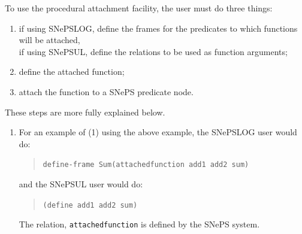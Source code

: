 \documentclass{book}
\begin{document}
To use the procedural attachment facility, the user must do three things:
\begin{enumerate}
 \item if using SNePSLOG, define the frames for the predicates to which
    functions will be attached,\\
    if using SNePSUL, define the relations to be used as function arguments;
\item  define the attached function;
\item  attach the function to a SNePS predicate node.
\end{enumerate}

These steps are more fully explained below.
\begin{enumerate}
\item  For an example of (1) using the above example, the SNePSLOG user
                      would do:
\begin{quote}
     \texttt{define-frame Sum(attachedfunction add1 add2 sum)}
\end{quote}
and the SNePSUL user would do:
\begin{quote}
     \texttt{(define add1 add2 sum)}
\end{quote}
The relation, \texttt{attachedfunction} is defined by the SNePS system.


\end{enumerate}
\end{document}
